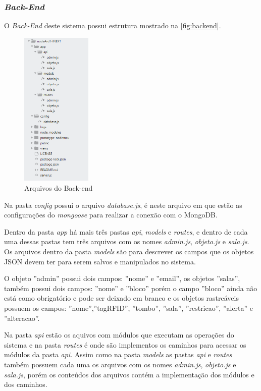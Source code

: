 \subsubsection{\textit{Back-End}}

O \textit{Back-End} deste sistema possui estrutura mostrado na \autoref{fig:backend}.
    \begin{figure}[H]
              \caption{\label{fig:backend}Arquivos do Back-end}
              \centering
              \includegraphics[width=0.3\textwidth]{Figuras/back_end.PNG}
    \end{figure}
\par 
Na pasta \textit{config} possui o arquivo  \textit{database.js}, é neste arquivo em que estão as configurações do  \textit{mongoose} para realizar a conexão com o MongoDB.
\par
Dentro da pasta  \textit{app} há mais três pastas  \textit{api}, \textit{models} e  \textit{routes}, e dentro de cada uma dessas pastas tem três arquivos com os nomes  \textit{admin.js}, \textit{objeto.js} e \textit{sala.js}. Os arquivos dentro da pasta  \textit{models} são para descrever os campos que os objetos JSON devem ter para serem salvos e manipulados no sistema.
\par
O objeto ''admin'' possui dois campos: ''nome'' e ''email'', os objetos ''salas'', também possui dois campos: ''nome'' e ''bloco'' porém o campo ''bloco'' ainda não está como obrigatório e pode ser deixado em branco e os objetos rastreáveis possuem os campos: ''nome'',''tagRFID'', ''tombo'', ''sala'', ''restricao'', ''alerta'' e ''alteracao''.
\par
Na pasta \textit{api} estão os aquivos com módulos que executam as operações do sistema e na pasta \textit{routes} é onde são implementos os caminhos para acessar os módulos da pasta \textit{api}. Assim como na pasta \textit{models} as pastas \textit{api} e \textit{routes} também possuem cada uma os arquivos com os nomes \textit{admin.js}, \textit{objeto.js} e \textit{sala.js}, porém os conteúdos dos arquivos contém a implementação dos módulos e dos caminhos.

